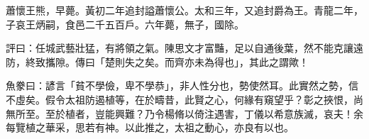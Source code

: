 
\begin{pinyinscope}
蕭懷王熊，早薨。黃初二年追封謚蕭懷公。太和三年，又追封爵為王。青龍二年，子哀王炳嗣，食邑二千五百戶。六年薨，無子，國除。

評曰：任城武藝壯猛，有將領之氣。陳思文才富豔，足以自通後葉，然不能克讓遠防，終致攜隙。傳曰「楚則失之矣。而齊亦未為得也」，其此之謂歟！

魚豢曰：諺言「貧不學儉，卑不學恭」，非人性分也，勢使然耳。此實然之勢，信不虛矣。假令太祖防遏植等，在於疇昔，此賢之心，何緣有窺望乎？彰之挾恨，尚無所至。至於植者，豈能興難？乃令楊脩以倚注遇害，丁儀以希意族滅，哀夫！余每覽植之華采，思若有神。以此推之，太祖之動心，亦良有以也。


\end{pinyinscope}